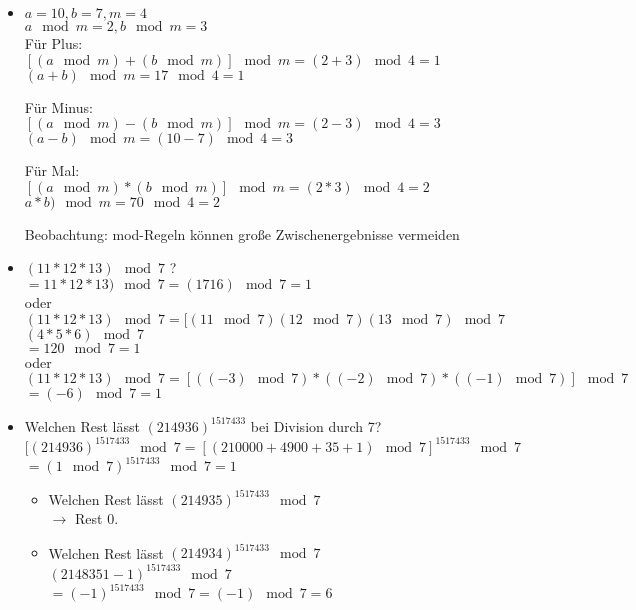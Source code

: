 \documentclass[a4paper, 12pt, twoside] {article}
\begin{document}
 \begin{itemize}

 \item $a = 10, b = 7, m = 4$ \\
 $ a \mod m = 2, b \mod m = 3$ \\

Für Plus: \\
$ [(a \mod m) + (b \mod m)] \mod m = (2+3) \mod 4 = 1$ \\
$(a + b) \mod m = 17 \mod 4 = 1$

Für Minus: \\
$[(a \mod m) - (b \mod m)] \mod m = (2 - 3) \mod 4 = 3$ \\
$(a - b) \mod m = (10-7) \mod 4 = 3$

Für Mal: \\
$[(a \mod m) * (b \mod m)] \mod m = (2 * 3) \mod 4 = 2$ \\
$a * b) \mod m = 70 \mod 4 = 2$

Beobachtung: mod-Regeln können große Zwischenergebnisse vermeiden

 \item $(11 * 12 * 13) \mod 7$ ? \\
 $=11 * 12 * 13) \mod 7 = (1716) \mod 7 = 1$ \\
 oder $(11 * 12 * 13) \mod 7 = [(11 \mod 7)(12 \mod 7) (13 \mod 7) \mod 7$ \\
 $(4 * 5 * 6) \mod 7$ \\
 $= 120 \mod 7 = 1$ \\
 oder $(11 * 12 * 13) \mod 7 = [((-3) \mod 7) * ((-2) \mod 7) * ((-1) \mod 7)] \mod 7$ \\
 $= (-6) \mod 7 = 1$

 \item Welchen Rest lässt $(214936)^{1517433}$ bei Division durch 7? \\
 $[(214936)^{1517433} \mod 7 = [(210000 + 4900 + 35 + 1) \mod 7]^{1517433} \mod 7$ \\
 $=(1 \mod 7)^{1517433} \mod 7 = 1$

 \begin{itemize}
 \item Welchen Rest lässt $(214935)^{1517433} \mod 7$ \\
 $\rightarrow$ Rest 0.

 \item Welchen Rest lässt $(214934)^{1517433} \mod 7$ \\
 $(2148351-1)^{1517433} \mod 7$ \\
 $=(-1)^{1517433} \mod 7 = (-1) \mod 7 = 6$


\end{itemize}
\end{itemize}
\end{document}
